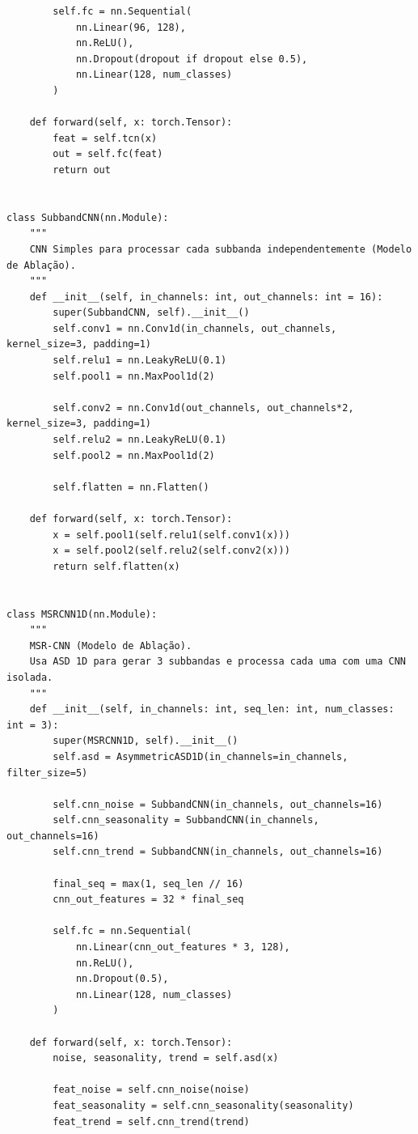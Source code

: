 \documentclass{article}
\begin{document}
\begin{verbatim}
        self.fc = nn.Sequential(
            nn.Linear(96, 128),
            nn.ReLU(),
            nn.Dropout(dropout if dropout else 0.5),
            nn.Linear(128, num_classes)
        )
        
    def forward(self, x: torch.Tensor):
        feat = self.tcn(x)
        out = self.fc(feat)
        return out


class SubbandCNN(nn.Module):
    """
    CNN Simples para processar cada subbanda independentemente (Modelo de Ablação).
    """
    def __init__(self, in_channels: int, out_channels: int = 16):
        super(SubbandCNN, self).__init__()
        self.conv1 = nn.Conv1d(in_channels, out_channels, kernel_size=3, padding=1)
        self.relu1 = nn.LeakyReLU(0.1)
        self.pool1 = nn.MaxPool1d(2)
        
        self.conv2 = nn.Conv1d(out_channels, out_channels*2, kernel_size=3, padding=1)
        self.relu2 = nn.LeakyReLU(0.1)
        self.pool2 = nn.MaxPool1d(2)
        
        self.flatten = nn.Flatten()
        
    def forward(self, x: torch.Tensor):
        x = self.pool1(self.relu1(self.conv1(x)))
        x = self.pool2(self.relu2(self.conv2(x)))
        return self.flatten(x)


class MSRCNN1D(nn.Module):
    """
    MSR-CNN (Modelo de Ablação).
    Usa ASD 1D para gerar 3 subbandas e processa cada uma com uma CNN isolada.
    """
    def __init__(self, in_channels: int, seq_len: int, num_classes: int = 3):
        super(MSRCNN1D, self).__init__()
        self.asd = AsymmetricASD1D(in_channels=in_channels, filter_size=5)
        
        self.cnn_noise = SubbandCNN(in_channels, out_channels=16)
        self.cnn_seasonality = SubbandCNN(in_channels, out_channels=16)
        self.cnn_trend = SubbandCNN(in_channels, out_channels=16)
        
        final_seq = max(1, seq_len // 16)
        cnn_out_features = 32 * final_seq 
        
        self.fc = nn.Sequential(
            nn.Linear(cnn_out_features * 3, 128), 
            nn.ReLU(),
            nn.Dropout(0.5),
            nn.Linear(128, num_classes)
        )
        
    def forward(self, x: torch.Tensor):
        noise, seasonality, trend = self.asd(x)
        
        feat_noise = self.cnn_noise(noise)
        feat_seasonality = self.cnn_seasonality(seasonality)
        feat_trend = self.cnn_trend(trend)
        

\end{verbatim}
\end{document}
